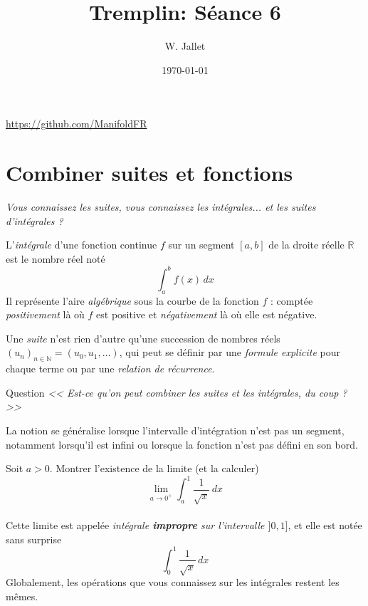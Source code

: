 \documentclass{beamer}
\title{{\sffamily Tremplin: Séance 6}}
\date{\today}
\author{W. Jallet}
\newcommand{\RR}{\mathbb R}
\newcommand{\NN}{\mathbb N}
\theoremstyle{plain}
\begin{document}
	
\begin{frame}
	\maketitle
	\url{https://github.com/ManifoldFR}
\end{frame}

\section*{Combiner suites et fonctions}

\begin{frame}

\textit{Vous connaissez les suites, vous connaissez les intégrales... et les suites d'intégrales ?}

L'\textit{intégrale} d'une fonction continue $f$ sur un segment $[a,b]$ de la droite réelle $\RR$ est le nombre réel noté
\[
\int_a^b f(x)\,dx
\]
Il représente l'aire \textit{algébrique} sous la courbe de la fonction $f$ : comptée \textit{positivement} là où $f$ est positive et \textit{négativement} là où elle est négative.
\end{frame}

\begin{frame}
Une \textit{suite} n'est rien d'autre qu'une succession de nombres réels $(u_n)_{n\in\NN} = (u_0,u_1,\ldots)$, qui peut se définir par une \textit{formule explicite} pour chaque terme ou par une \textit{relation de récurrence}.

\end{frame}

\begin{frame}{Question}
	\textit{<< Est-ce qu'on peut combiner les suites et les intégrales, du coup ? >>}
\end{frame}

\begin{frame}{}
La notion se généralise lorsque l'intervalle d'intégration n'est pas un segment, notamment lorsqu'il est infini ou lorsque la fonction n'est pas défini en son bord.

Soit $a > 0$. Montrer l'existence de la limite (et la calculer) 
\[
\lim_{a\to 0^+} \int_a^1 \frac 1{\sqrt{x}}\,dx
\]\\
Cette limite est appelée \textit{intégrale \textbf{impropre} sur l'intervalle $]0,1]$}, et elle est notée sans surprise
\[
\int_0^1 \frac 1{\sqrt{x}}\,dx
\]
Globalement, les opérations que vous connaissez sur les intégrales restent les mêmes.

\end{frame}
\end{document}
